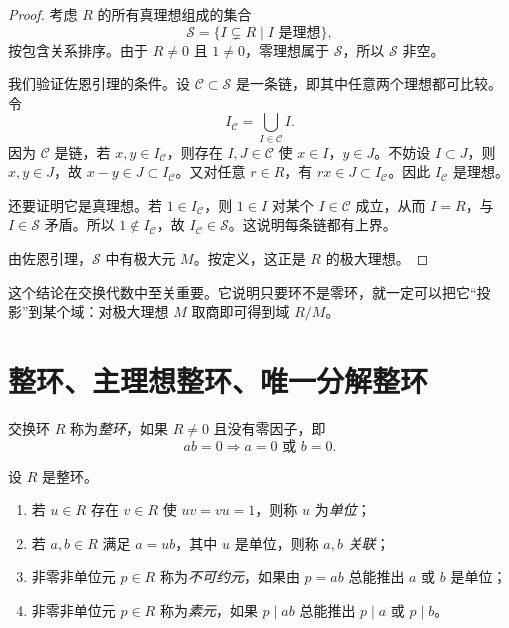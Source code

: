 \begin{proof}
考虑 $R$ 的所有真理想组成的集合
\[
\mathcal{S}=\{I\subsetneq R\mid I\text{ 是理想}\},
\]
按包含关系排序。由于 $R\neq 0$ 且 $1\neq 0$，零理想属于 $\mathcal{S}$，所以 $\mathcal{S}$ 非空。

我们验证佐恩引理的条件。设 $\mathcal{C}\subset \mathcal{S}$ 是一条链，即其中任意两个理想都可比较。令
\[
I_\mathcal{C}=\bigcup_{I\in \mathcal{C}} I.
\]
因为 $\mathcal{C}$ 是链，若 $x,y\in I_\mathcal{C}$，则存在 $I,J\in\mathcal{C}$ 使 $x\in I$，$y\in J$。不妨设 $I\subset J$，则 $x,y\in J$，故 $x-y\in J\subset I_\mathcal{C}$。又对任意 $r\in R$，有 $rx\in J\subset I_\mathcal{C}$。因此 $I_\mathcal{C}$ 是理想。

还要证明它是真理想。若 $1\in I_\mathcal{C}$，则 $1\in I$ 对某个 $I\in\mathcal{C}$ 成立，从而 $I=R$，与 $I\in\mathcal{S}$ 矛盾。所以 $1\notin I_\mathcal{C}$，故 $I_\mathcal{C}\in\mathcal{S}$。这说明每条链都有上界。

由佐恩引理，$\mathcal{S}$ 中有极大元 $M$。按定义，这正是 $R$ 的极大理想。
\end{proof}

\begin{remark}
这个结论在交换代数中至关重要。它说明只要环不是零环，就一定可以把它“投影”到某个域：对极大理想 $M$ 取商即可得到域 $R/M$。
\end{remark}

\section{整环、主理想整环、唯一分解整环}

\begin{definition}
交换环 $R$ 称为\emph{整环}，如果 $R\neq 0$ 且没有零因子，即
\[
ab=0\Longrightarrow a=0\text{ 或 }b=0.
\]
\end{definition}

\begin{definition}
设 $R$ 是整环。
\begin{enumerate}[label=\textnormal{(\arabic*)}]
  \item 若 $u\in R$ 存在 $v\in R$ 使 $uv=vu=1$，则称 $u$ 为\emph{单位}；
  \item 若 $a,b\in R$ 满足 $a=ub$，其中 $u$ 是单位，则称 $a,b$ \emph{关联}；
  \item 非零非单位元 $p\in R$ 称为\emph{不可约元}，如果由 $p=ab$ 总能推出 $a$ 或 $b$ 是单位；
  \item 非零非单位元 $p\in R$ 称为\emph{素元}，如果 $p\mid ab$ 总能推出 $p\mid a$ 或 $p\mid b$。
\end{enumerate}
\end{definition}

